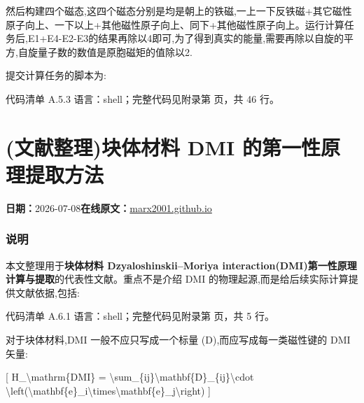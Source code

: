 \documentclass[lang=cn,scheme=chinese,color=blue,device=normal,toc=onecol,math=cm]{elegantbook}
\begin{document}
然后构建四个磁态,这四个磁态分别是均是朝上的铁磁,一上一下反铁磁+其它磁性原子向上、一下以上+其他磁性原子向上、同下+其他磁性原子向上。运行计算任务后,E1+E4-E2-E3的结果再除以4即可,为了得到真实的能量,需要再除以自旋的平方,自旋量子数的数值是原胞磁矩的值除以2.\par


提交计算任务的脚本为:\par


\begin{codeindexbox}{代码清单 A.5.3}
语言：shell；完整代码见附录第 \pageref{code:5:3} 页，共 46 行。
\end{codeindexbox}



\section{(文献整理)块体材料 DMI 的第一性原理提取方法}
\begin{articlemeta}
\textbf{日期：}2026-07-08\hfill\textbf{在线原文：}\href{https://marx2001.github.io/sci-note\_posts/20260708DMI}{marx2001.github.io}
\end{articlemeta}

\subsubsection{说明}


本文整理用于\textbf{块体材料 Dzyaloshinskii–Moriya interaction(DMI)第一性原理计算与提取}的代表性文献。重点不是介绍 DMI 的物理起源,而是给后续实际计算提供文献依据,包括:\par


\begin{codeindexbox}{代码清单 A.6.1}
语言：shell；完整代码见附录第 \pageref{code:6:1} 页，共 5 行。
\end{codeindexbox}


对于块体材料,DMI 一般不应只写成一个标量 (D),而应写成每一类磁性键的 DMI 矢量:\par


[ H\_\allowbreak{}\textbackslash{}\allowbreak{}mathrm\{DMI\} = \textbackslash{}\allowbreak{}sum\_\allowbreak{}\{ij\}\textbackslash{}\allowbreak{}mathbf\{D\}\_\allowbreak{}\{ij\}\textbackslash{}\allowbreak{}cdot \textbackslash{}\allowbreak{}left(\textbackslash{}\allowbreak{}mathbf\{e\}\_\allowbreak{}i\textbackslash{}\allowbreak{}times\textbackslash{}\allowbreak{}mathbf\{e\}\_\allowbreak{}j\textbackslash{}\allowbreak{}right) ]\par
\end{document}
